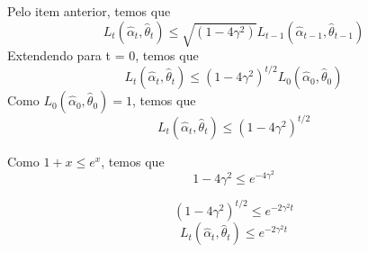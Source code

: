 
Pelo item anterior, temos que
\begin{equation*}
    L_t(\hat{\alpha}_t, \hat{\theta}_t) \le \sqrt{( 1 - 4 \gamma^2 )} L_{t-1}(\hat{\alpha}_{t-1}, \hat{\theta}_{t-1})
\end{equation*}
Extendendo para t = 0, temos que
\begin{equation*}
    L_t(\hat{\alpha}_t, \hat{\theta}_t) \le ( 1 - 4 \gamma^2 )^{t/2} L_0(\hat{\alpha}_0, \hat{\theta}_0)
\end{equation*}
Como $L_0(\hat{\alpha}_0, \hat{\theta}_0) = 1$, temos que
\begin{equation*}
    L_t(\hat{\alpha}_t, \hat{\theta}_t) \le ( 1 - 4 \gamma^2 )^{t/2}
\end{equation*}

Como $1+x \le e^x$, temos que
\begin{equation*}
    1-4\gamma^2 \le e^{-4\gamma^2}
\end{equation*}

\begin{equation*}
    (1-4\gamma^2)^{t/2} \le e^{-2\gamma^2 t}
\end{equation*}
\begin{equation*}
    L_t(\hat{\alpha}_t, \hat{\theta}_t) \le e^{-2 \gamma^2 t}
\end{equation*}
